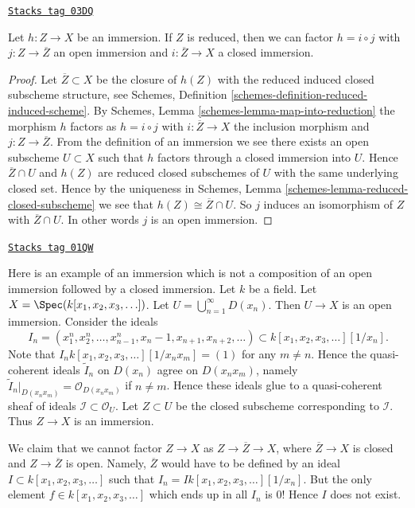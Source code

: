 \begin{lemma}
\label{morphisms-lemma-factor-reduced-immersion}
\href{https://stacks.math.columbia.edu/tag/03DQ}{\texttt{Stacks tag 03DQ}}

Let $h : Z \to X$ be an immersion.
If $Z$ is reduced, then we can factor
$h = i \circ j$ with $j : Z \to \overline{Z}$ an
open immersion and $i : \overline{Z} \to X$ a closed immersion.
\end{lemma}

\begin{proof}
Let $\overline{Z} \subset X$ be the closure of $h(Z)$ with the reduced
induced closed subscheme structure, see
Schemes, Definition \ref{schemes-definition-reduced-induced-scheme}.
By Schemes, Lemma \ref{schemes-lemma-map-into-reduction}
the morphism $h$ factors as
$h = i \circ j$ with $i : \overline{Z} \to X$ the inclusion morphism
and $j : Z \to \overline{Z}$. From the definition of an immersion we
see there exists an open subscheme $U \subset X$ such that
$h$ factors through a closed immersion into $U$. Hence
$\overline{Z} \cap U$ and $h(Z)$ are reduced closed subschemes
of $U$ with the same underlying closed set. Hence by the uniqueness
in Schemes, Lemma \ref{schemes-lemma-reduced-closed-subscheme}
we see that $h(Z) \cong \overline{Z} \cap U$.
So $j$ induces an isomorphism of $Z$ with $\overline{Z} \cap U$.
In other words $j$ is an open immersion.
\end{proof}


\begin{example}[Thibaut]
\label{morphisms-example-thibaut}
\href{https://stacks.math.columbia.edu/tag/01QW}{\texttt{Stacks tag 01QW}}

Here is an example of an immersion which is not a composition of an
open immersion followed by a closed immersion.
Let $k$ be a field.
Let $X = \Spec(k[x_1, x_2, x_3, \ldots])$.
Let $U = \bigcup_{n = 1}^{\infty} D(x_n)$.
Then $U \to X$ is an open immersion.
Consider the ideals
$$
I_n =
(x_1^n, x_2^n, \ldots, x_{n - 1}^n, x_n - 1, x_{n + 1}, x_{n + 2}, \ldots)
\subset
k[x_1, x_2, x_3, \ldots][1/x_n].
$$
Note that $I_n k[x_1, x_2, x_3, \ldots][1/x_nx_m] = (1)$
for any $m \not = n$. Hence the quasi-coherent ideals
$\widetilde I_n$ on $D(x_n)$ agree on $D(x_nx_m)$, namely
$\widetilde I_n|_{D(x_nx_m)} = \mathcal{O}_{D(x_n x_m)}$ if
$n \not = m$. Hence these ideals glue to a quasi-coherent sheaf of ideals
$\mathcal{I} \subset \mathcal{O}_U$.
Let $Z \subset U$ be the closed subscheme corresponding to
$\mathcal{I}$. Thus $Z \to X$ is an immersion.

\medskip\noindent
We claim that we cannot factor $Z \to X$ as
$Z \to \overline{Z} \to X$, where $\overline{Z} \to X$ is closed
and $Z \to \overline{Z}$ is open. Namely, $\overline{Z}$ would
have to be defined by an ideal $I \subset k[x_1, x_2, x_3, \ldots]$
such that $I_n = I k[x_1, x_2, x_3, \ldots][1/x_n]$.
But the only element $f \in k[x_1, x_2, x_3, \ldots]$
which ends up in all $I_n$ is $0$! Hence $I$ does not exist.
\end{example}

